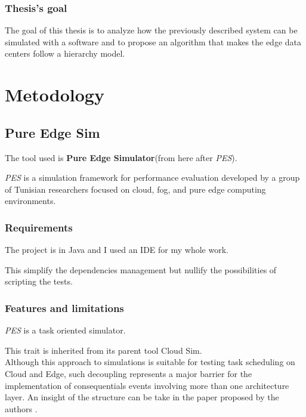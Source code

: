\documentclass[12pt]{report}
\begin{document}
\section{Thesis's goal}
The goal of this thesis is to analyze how the previously described system can be simulated with a software and to propose an algorithm that makes the edge data centers follow a hierarchy model.

\part*{Metodology}
\chapter{Pure Edge Sim}
The tool used is \textbf{Pure Edge Simulator}(from here after \textit{PES}).

\textit{PES} is a simulation framework for performance evaluation developed by a group of Tunisian researchers focused on cloud, fog, and pure edge computing environments.

\section{Requirements}
The project is in Java and I used an IDE for my whole work.

This simplify the dependencies management but nullify the possibilities of scripting the tests.

\section{Features and limitations}
\textit{PES} is a task oriented simulator.

This trait is inherited from its parent tool Cloud Sim.\\
Although this approach to simulations is suitable for testing task scheduling on Cloud and Edge, such decoupling represents a major barrier for the implementation of consequentials events involving more than one architecture layer.
An insight of the structure can be take in the paper proposed by the authors \cite{MechalikhTM21}.
\end{document}
